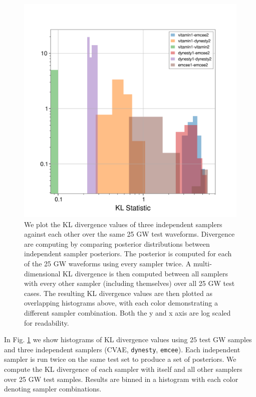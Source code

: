 \documentclass[%
showpacs,
 amsmath,amssymb,
 aps,
 twocolumn,
 prl,
 reprint,
floatfix,
]{revtex4-1}
\begin{document}
%
%

%
%
\begin{figure}
    \includegraphics[width=\columnwidth]{images/hist-kl.png}
    \caption{\label{fig:kl_results} We plot the KL divergence values 
    of three independent samplers against each other over the same 25 \ac{GW} 
    test waveforms. Divergence are computing by comparing posterior 
    distributions between independent sampler posteriors. The posterior 
    is computed for each of the 25 \ac{GW} waveforms using every sampler 
    twice. A multi-dimensional KL divergence is then computed 
    between all samplers 
    with every other sampler (including themselves) over all 25 \ac{GW} 
    test cases. The resulting KL divergence values are 
    then plotted as overlapping histograms 
    above, with each color demonstrating a different sampler combination. 
    Both the y and x axis are log scaled for readability.}
\end{figure}
%
In Fig. \ref{fig:kl_results} we show histograms of \ac{KL} divergence values 
using $25$ test GW samples and three independent samplers (\ac{CVAE}, 
\texttt{dynesty}, \texttt{emcee}). Each independent sampler is run twice 
on the same test set to produce a set of posteriors. We compute the KL divergence of each sampler with itself and all other samplers over 25 
\ac{GW} test samples. Results are binned in a histogram with each color 
denoting sampler combinations.
\end{document}
